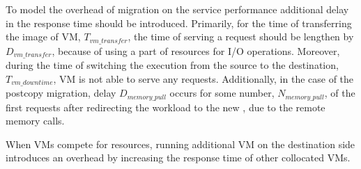 To model the overhead of migration on the service performance additional delay in the response time should be introduced.
Primarily, for the time of transferring the image of VM, $T_{vm\_transfer}$, the time of serving a request should be lengthen by $D_{vm\_transfer}$, because of using a part of resources for I/O operations.
Moreover, during the time of switching the execution from the source to the destination, $T_{vm\_downtime}$, VM is not able to serve any requests.
Additionally, in the case of the postcopy migration, delay  $D_{memory\_pull}$ occurs for some number, $N_{memory\_pull}$, of the first requests after redirecting the workload to the new \dc{}, due to the remote memory calls.

When VMs compete for resources, running additional VM on the destination side introduces an overhead by increasing the response time of other collocated VMs.